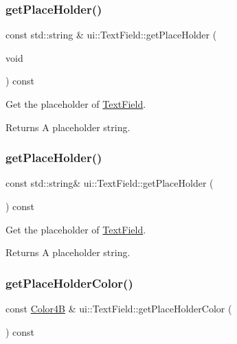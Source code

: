 \subsubsection{\texorpdfstring{get\+Place\+Holder()}{getPlaceHolder()}\hspace{0.1cm}{\footnotesize\ttfamily [1/2]}}
{\footnotesize\ttfamily const std\+::string \& ui\+::\+Text\+Field\+::get\+Place\+Holder (\begin{DoxyParamCaption}\item[{void}]{ }\end{DoxyParamCaption}) const}



Get the placeholder of \hyperlink{classui_1_1TextField}{Text\+Field}. 

\begin{DoxyReturn}{Returns}
A placeholder string. 
\end{DoxyReturn}
\mbox{\label{classui_1_1TextField_a96fbe0d0a7e870d072af2f6acda48e63}} 
\subsubsection{\texorpdfstring{get\+Place\+Holder()}{getPlaceHolder()}\hspace{0.1cm}{\footnotesize\ttfamily [2/2]}}
{\footnotesize\ttfamily const std\+::string\& ui\+::\+Text\+Field\+::get\+Place\+Holder (\begin{DoxyParamCaption}{ }\end{DoxyParamCaption}) const}



Get the placeholder of \hyperlink{classui_1_1TextField}{Text\+Field}. 

\begin{DoxyReturn}{Returns}
A placeholder string. 
\end{DoxyReturn}
\mbox{\label{classui_1_1TextField_a9ee14d4839a1fc60aeb26ea37edd76f0}} 
\subsubsection{\texorpdfstring{get\+Place\+Holder\+Color()}{getPlaceHolderColor()}\hspace{0.1cm}{\footnotesize\ttfamily [1/2]}}
{\footnotesize\ttfamily const \hyperlink{structColor4B}{Color4B} \& ui\+::\+Text\+Field\+::get\+Place\+Holder\+Color (\begin{DoxyParamCaption}{ }\end{DoxyParamCaption}) const}



